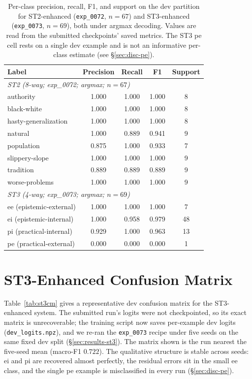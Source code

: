 \documentclass{ceurart}
\begin{document}
\begin{table}[h]
\centering
\small
\caption{Per-class precision, recall, F1, and support on the dev
partition for ST2-enhanced (\texttt{exp\_0072}, $n=67$) and ST3-enhanced
(\texttt{exp\_0073}, $n=69$), both under argmax decoding. Values are read
from the submitted checkpoints' saved metrics. The ST3 \textsf{pe} cell
rests on a single dev example and is not an informative per-class
estimate (see \S\ref{sec:disc-pe}).}
\label{tab:perclass}
\begin{tabular}{lcccc}
\toprule
Label & Precision & Recall & F1 & Support \\
\midrule
\multicolumn{5}{l}{\textit{ST2 (8-way; exp\_0072; argmax; $n=67$)}} \\ %
authority             & 1.000 & 1.000 & 1.000 & 8 \\
black-white           & 1.000 & 1.000 & 1.000 & 8 \\
hasty-generalization  & 1.000 & 1.000 & 1.000 & 8 \\
natural               & 1.000 & 0.889 & 0.941 & 9 \\
population            & 0.875 & 1.000 & 0.933 & 7 \\
slippery-slope        & 1.000 & 1.000 & 1.000 & 9 \\
tradition             & 0.889 & 0.889 & 0.889 & 9 \\
worse-problems        & 1.000 & 1.000 & 1.000 & 9 \\
\midrule
\multicolumn{5}{l}{\textit{ST3 (4-way; exp\_0073; argmax; $n=69$)}} \\ %
ee (epistemic-external) & 1.000 & 1.000 & 1.000 & 7 \\
ei (epistemic-internal) & 1.000 & 0.958 & 0.979 & 48 \\
pi (practical-internal) & 0.929 & 1.000 & 0.963 & 13 \\
pe (practical-external) & 0.000 & 0.000 & 0.000 & 1 \\
\bottomrule
\end{tabular}
\end{table}

\section{ST3-Enhanced Confusion Matrix}
\label{app:st3cm}

Table~\ref{tab:st3cm} gives a representative dev confusion matrix for the
ST3-enhanced system. The submitted run's logits were not checkpointed, so its
exact matrix is unrecoverable; the training script now saves per-example dev
logits (\texttt{dev\_logits.npz}), and we re-ran the \texttt{exp\_0073} recipe
under five seeds on the same fixed dev split (\S\ref{sec:results-st3}). The
matrix shown is the run nearest the five-seed mean (macro-F1 $0.722$). The
qualitative structure is stable across seeds: \textsf{ei} and \textsf{pi} are
recovered almost perfectly, the residual errors sit in the small \textsf{ee}
class, and the single \textsf{pe} example is misclassified in every run
(\S\ref{sec:disc-pe}).
\end{document}
